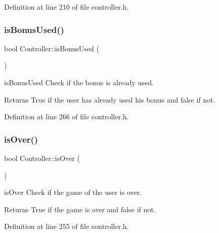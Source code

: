 Definition at line 210 of file controller.\+h.

\mbox{\label{class_controller_a6968f47298e55d9957bb330cf9cf957f}} 
\subsubsection{\texorpdfstring{is\+Bonus\+Used()}{isBonusUsed()}}
{\footnotesize\ttfamily bool Controller\+::is\+Bonus\+Used (\begin{DoxyParamCaption}{ }\end{DoxyParamCaption})\hspace{0.3cm}{\ttfamily [inline]}}



is\+Bonus\+Used Check if the bonus is already used. 

\begin{DoxyReturn}{Returns}
True if the user has already used his bonus and false if not. 
\end{DoxyReturn}


Definition at line 266 of file controller.\+h.

\mbox{\label{class_controller_a94cd37594f77fa357c9c6842884788d3}} 
\subsubsection{\texorpdfstring{is\+Over()}{isOver()}}
{\footnotesize\ttfamily bool Controller\+::is\+Over (\begin{DoxyParamCaption}{ }\end{DoxyParamCaption})\hspace{0.3cm}{\ttfamily [inline]}}



is\+Over Check if the game of the user is over. 

\begin{DoxyReturn}{Returns}
True if the game is over and false if not. 
\end{DoxyReturn}


Definition at line 255 of file controller.\+h.

\mbox{\label{class_controller_a970af2439cfa0d315d769a4d92122928}} 
